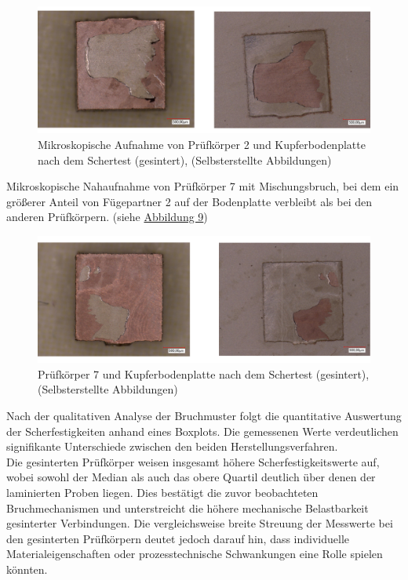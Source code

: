 \begin{figure}[H]
    \centering
    \includegraphics[scale=0.2]{Bilder/2s.png}
    \caption{Mikroskopische Aufnahme von Prüfkörper 2 und Kupferbodenplatte nach dem Schertest (gesintert), (Selbsterstellte Abbildungen)}
    \label{sin2}
\end{figure}

Mikroskopische Nahaufnahme von Prüfkörper 7 mit Mischungsbruch, bei dem ein größerer Anteil von Fügepartner 2 auf der Bodenplatte verbleibt als bei den anderen Prüfkörpern. (siehe \hyperref[sin7]{Abbildung 9})

\begin{figure}[H]
    \centering
    \includegraphics[scale=0.2]{Bilder/7s.png}
    \caption{Prüfkörper 7 und Kupferbodenplatte nach dem Schertest (gesintert), (Selbsterstellte Abbildungen)}
    \label{sin7}
\end{figure}

Nach der qualitativen Analyse der Bruchmuster folgt die quantitative Auswertung der Scherfestigkeiten anhand eines Boxplots. Die gemessenen Werte verdeutlichen signifikante Unterschiede zwischen den beiden Herstellungsverfahren.\\

Die gesinterten Prüfkörper weisen insgesamt höhere Scherfestigkeitswerte auf, wobei sowohl der Median als auch das obere Quartil deutlich über denen der laminierten Proben liegen. Dies bestätigt die zuvor beobachteten Bruchmechanismen und unterstreicht die höhere mechanische Belastbarkeit gesinterter Verbindungen. Die vergleichsweise breite Streuung der Messwerte bei den gesinterten Prüfkörpern deutet jedoch darauf hin, dass individuelle Materialeigenschaften oder prozesstechnische Schwankungen eine Rolle spielen könnten.\\

